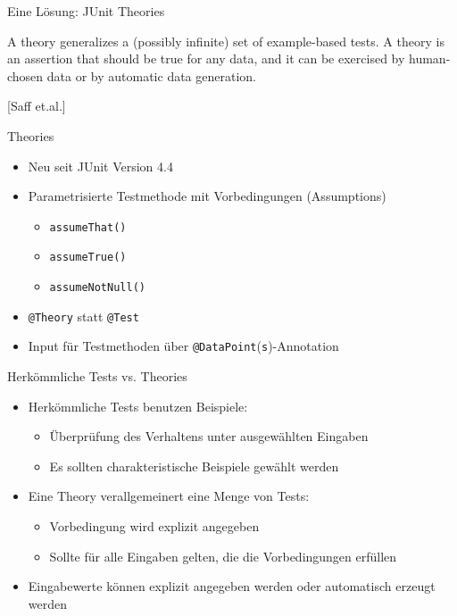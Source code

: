 \begin{frame}{Eine Lösung: JUnit Theories}

\glqq{}A theory generalizes a (possibly infinite) set of example-based tests. A theory is an assertion that should be true for any data, and it can be exercised by human-chosen data or by automatic data generation.\grqq

\hfill[Saff et.al.]

\end{frame}

\begin{frame}{Theories}
	\begin{itemize}
		\item Neu seit JUnit Version 4.4
		\item Parametrisierte Testmethode mit Vorbedingungen (Assumptions)
			\begin{itemize}
				\item \texttt{assumeThat()}
				\item \texttt{assumeTrue()}
				\item \texttt{assumeNotNull()}
			\end{itemize}
		\item \texttt{@Theory} statt \texttt{@Test}
		\item Input für Testmethoden über \texttt{@DataPoint}(\texttt{s})-Annotation
	\end{itemize}
\end{frame}

\begin{frame}{Herkömmliche Tests vs. Theories}
	\begin{itemize}
		\item Herkömmliche Tests benutzen Beispiele:
			\begin{itemize}
				\item Überprüfung des Verhaltens unter ausgewählten Eingaben
				\item Es sollten charakteristische Beispiele gewählt werden
			\end{itemize}
		\item Eine Theory verallgemeinert eine Menge von Tests:
			\begin{itemize}
				\item Vorbedingung wird explizit angegeben
				\item Sollte für alle Eingaben gelten, die die Vorbedingungen erfüllen
			\end{itemize}
		\item Eingabewerte können explizit angegeben werden oder automatisch erzeugt werden
	\end{itemize}
\end{frame}


